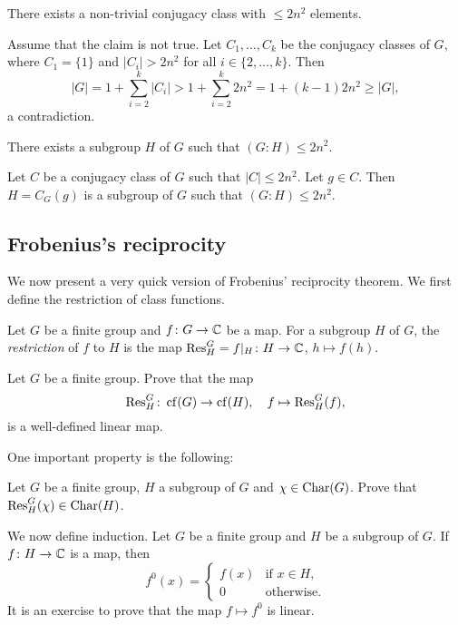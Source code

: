 \begin{claim}
    There exists a non-trivial conjugacy class with $\leq 2n^2$ elements.
\end{claim}

Assume that the claim is not true. Let
$C_1,\dots,C_k$ be the conjugacy classes of $G$, where 
$C_1=\{1\}$ and $|C_i|>2n^2$ for all $i\in\{2,\dots,k\}$. Then
\[
|G|=1+\sum_{i=2}^k|C_i|>1+\sum_{i=2}^k2n^2=1+(k-1)2n^2\geq |G|,
\]
a contradiction. 

\begin{claim}
    There exists a subgroup $H$ of $G$ such that
    $(G:H)\leq 2n^2$.
\end{claim}

Let $C$ be a conjugacy class of $G$ such that 
$|C|\leq 2n^2$. Let $g\in C$.  
Then $H=C_G(g)$ is a subgroup of $G$ such that
$(G:H)\leq 2n^2$. 



\subsection{Frobenius's reciprocity}

We now present a very quick version of Frobenius'
reciprocity theorem. We first 
define the restriction of class functions. 

\begin{definition}
    Let $G$ be a finite group and $f\colon G\to\mathbb{C}$ be
    a map. For a subgroup $H$ of $G$, the \emph{restriction}
    of $f$ to $H$ is the map 
    $\operatorname{Res}_H^G=f|_H\colon H\to\mathbb{C}$, $h\mapsto f(h)$. 
\end{definition}

\begin{exercise}
\label{xca:restriction}
    Let $G$ be a finite group. Prove that
    the map 
    \[
    \operatorname{Res}_H^G\colon\operatorname{cf}(G)\to\operatorname{cf}(H),\quad  f\mapsto\operatorname{Res}_H^G(f),
    \]
    is a well-defined linear map. 
\end{exercise}

One important property is the following: 

\begin{exercise}
\label{xca:Res}
Let $G$ be a finite group, $H$ a subgroup of $G$ and $\chi \in \operatorname{Char}(G)$. Prove that $\operatorname{Res}_H^G(\chi) \in \operatorname{Char}(H)$.
\end{exercise}

We now define induction. Let $G$ be a finite group
and $H$ be a subgroup of $G$. If $f\colon H\to\mathbb{C}$ is a map, 
then 
\[
f^0(x)=\begin{cases}
    f(x) & \text{if $x\in H$},\\
    0 & \text{otherwise}.
    \end{cases}
\]
It is an exercise to prove that
the map $f\mapsto f^0$ is linear. 

